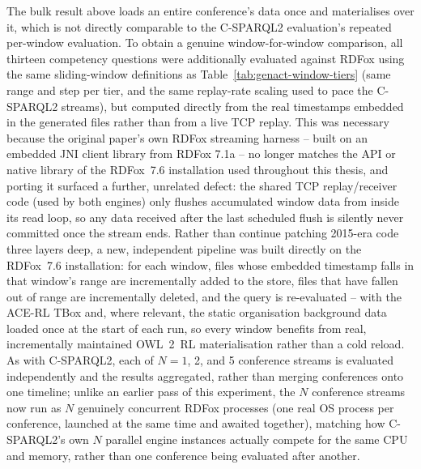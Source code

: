 The bulk result above loads an entire conference's data once and materialises
over it, which is not directly comparable to the C-SPARQL2 evaluation's
repeated per-window evaluation. To obtain a genuine window-for-window
comparison, all thirteen competency questions were additionally evaluated
against RDFox using the same sliding-window definitions as
Table~\ref{tab:genact-window-tiers} (same range and step per tier, and the
same replay-rate scaling used to pace the C-SPARQL2 streams), but computed
directly from the real timestamps embedded in the generated files rather than
from a live TCP replay. This was necessary because the original paper's own
RDFox streaming harness -- built on an embedded JNI client library from RDFox
7.1a -- no longer matches the API or native library of the RDFox~7.6
installation used throughout this thesis, and porting it surfaced a further,
unrelated defect: the shared TCP replay/receiver code (used by both engines)
only flushes accumulated window data from inside its read loop, so any data
received after the last scheduled flush is silently never committed once the
stream ends. Rather than continue patching 2015-era code three layers deep,
a new, independent pipeline was built directly on the RDFox~7.6 installation:
for each window, files whose embedded timestamp falls in that window's range
are incrementally added to the store, files that have fallen out of range are
incrementally deleted, and the query is re-evaluated -- with the ACE-RL TBox
and, where relevant, the static organisation background data loaded once at
the start of each run, so every window benefits from real, incrementally
maintained OWL~2~RL materialisation rather than a cold reload. As with
C-SPARQL2, each of $N=1$, 2, and 5 conference streams is evaluated
independently and the results aggregated, rather than merging conferences
onto one timeline; unlike an earlier pass of this experiment, the $N$
conference streams now run as $N$ genuinely concurrent RDFox processes
(one real OS process per conference, launched at the same time and awaited
together), matching how C-SPARQL2's own $N$ parallel engine instances
actually compete for the same CPU and memory, rather than one conference
being evaluated after another.

